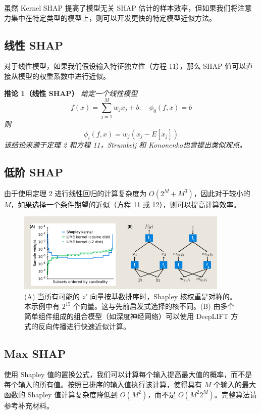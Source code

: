 \documentclass[12pt, a4paper]{ctexart} %
\begin{document}
虽然 Kernel SHAP 提高了模型无关 SHAP 估计的样本效率，但如果我们将注意力集中在特定类型的模型上，则可以开发更快的特定模型近似方法。

\subsection*{线性 SHAP}
对于线性模型，如果我们假设输入特征独立性（方程 11），那么 SHAP 值可以直接从模型的权重系数中进行近似。

\textbf{推论 1（线性 SHAP）} \textit{给定一个线性模型} 
\[
f(x) = \sum_{j=1}^{M} w_j x_j + b:\quad \phi_0(f, x) = b
\]
\textit{则}
\[
\phi_i(f, x) = w_j (x_j - E[x_j])
\]
\textit{该结论来源于定理 2 和方程 11，Strumbelj 和 Kononenko也曾提出类似观点。}

\subsection*{低阶 SHAP}

由于使用定理 2 进行线性回归的计算复杂度为 $O(2^M + M^3)$，因此对于较小的 $M$，如果选择一个条件期望的近似（方程 11 或 12），则可以提高计算效率。

\begin{figure}[h]
    \centering
    \includegraphics[width=0.9\textwidth]{./img/img_2.png}
    \caption{(A) 当所有可能的 $z'$ 向量按基数排序时，Shapley 核权重是对称的。本示例中有 $2^{15}$ 个向量。这与先前启发式选择的核不同。(B) 由多个简单组件组成的组合模型（如深度神经网络）可以使用 DeepLIFT 方式的反向传播进行快速近似计算。}
\end{figure}

\subsection*{Max SHAP}

使用 Shapley 值的置换公式，我们可以计算每个输入提高最大值的概率，而不是每个输入的所有值。按照已排序的输入值执行该计算，使得具有 $M$ 个输入的最大函数的 Shapley 值计算复杂度降低到 $O(M^2)$，而不是 $O(M^2 2^M)$。完整算法请参考补充材料。
\end{document}
